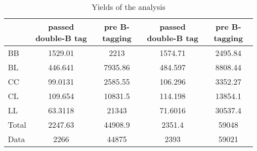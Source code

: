 \documentclass[10pt]{article}
\begin{document}
\begin{table}[htbp]
\begin{center}
\begin{tabular}{|l|S|S|S|S|}
\hline 
 & {passed double-B tag} & {pre B-tagging} & {passed double-B tag} & {pre B-tagging}\\
\hline 
  BB   & 1529.01  & 2213  & 1574.71  & 2495.84  \\ 
  BL   & 446.641  & 7935.86  & 484.597  & 8808.44  \\ 
  CC   & 99.0131  & 2585.55  & 106.296  & 3352.27  \\ 
  CL   & 109.654  & 10831.5  & 114.198  & 13854.1  \\ 
  LL   & 63.3118  & 21343  & 71.6016  & 30537.4  \\ 
\hline 
  Total  & 2247.63  & 44908.9  & 2351.4  & 59048  \\ 
\hline 
  Data   & 2266 & 44875 & 2393 & 59021 \\ 
\hline 
\end{tabular} 
\caption{Yields of the analysis} 
\end{center} 
\end{table} 
\end{document}
